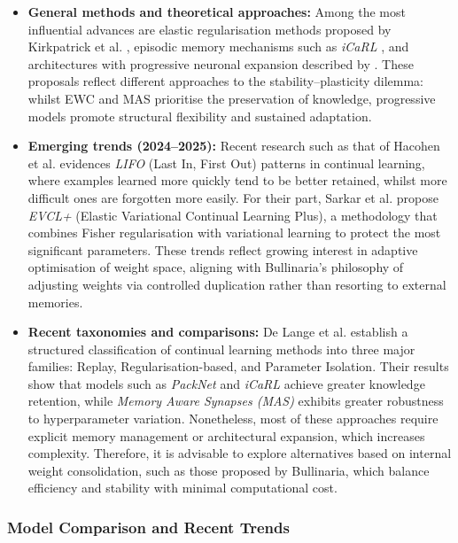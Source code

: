 \begin{itemize}
    \item \textbf{General methods and theoretical approaches:}  
    Among the most influential advances are elastic regularisation methods proposed by Kirkpatrick et al. \cite{kirkpatrick2017overcoming}, episodic memory mechanisms such as \textit{iCaRL} \cite{rebuffi2017icarl}, and architectures with progressive neuronal expansion described by \cite{bullinaria2009}.  
    These proposals reflect different approaches to the stability–plasticity dilemma: whilst EWC and MAS prioritise the preservation of knowledge, progressive models promote structural flexibility and sustained adaptation.

    \item \textbf{Emerging trends (2024–2025):}  
    Recent research such as that of Hacohen et al. \cite{hacohenforgetting} evidences \textit{LIFO} (Last In, First Out) patterns in continual learning, where examples learned more quickly tend to be better retained, whilst more difficult ones are forgotten more easily.  
    For their part, Sarkar et al. \cite{sarkar2025adaptive} propose \textit{EVCL+} (Elastic Variational Continual Learning Plus), a methodology that combines Fisher regularisation with variational learning to protect the most significant parameters.  
    These trends reflect growing interest in adaptive optimisation of weight space, aligning with Bullinaria’s philosophy of adjusting weights via controlled duplication rather than resorting to external memories.

    \item \textbf{Recent taxonomies and comparisons:}  
    De Lange et al. \cite{de2021continual} establish a structured classification of continual learning methods into three major families: Replay, Regularisation-based, and Parameter Isolation.  
    Their results show that models such as \textit{PackNet} and \textit{iCaRL} achieve greater knowledge retention, while \textit{Memory Aware Synapses (MAS)} exhibits greater robustness to hyperparameter variation.  
    Nonetheless, most of these approaches require explicit memory management or architectural expansion, which increases complexity.  
    Therefore, it is advisable to explore alternatives based on internal weight consolidation, such as those proposed by Bullinaria, which balance efficiency and stability with minimal computational cost.
\end{itemize}

\subsubsection{Model Comparison and Recent Trends}

